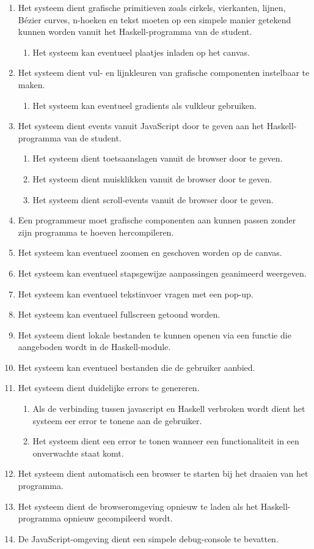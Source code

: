\begin{enumerate}[{R}1]
	\item Het systeem dient grafische primitieven zoals cirkels, vierkanten, lijnen, Bézier curves, n-hoeken en tekst moeten op een simpele manier getekend kunnen worden vanuit het Haskell-programma van de student.
	\begin{enumerate}[{R1.}1]
		\item Het systeem kan eventueel plaatjes inladen op het canvas.
	\end{enumerate}
	\item Het systeem dient vul- en lijnkleuren van grafische componenten instelbaar te maken.
	\begin{enumerate}[{R2.}1]
		\item Het systeem kan eventueel gradients als vulkleur gebruiken.
	\end{enumerate}
	\item Het systeem dient events vanuit JavaScript door te geven aan het Haskell-programma van de student.
	\begin{enumerate}[{R3.}1]
		\item Het systeem dient toetsaanslagen vanuit de browser door te geven.
		\item Het systeem dient muisklikken vanuit de browser door te geven.
		\item Het systeem dient scroll-events vanuit de browser door te geven.
	\end{enumerate}
	\item Een programmeur moet grafische componenten aan kunnen passen zonder zijn programma te hoeven hercompileren.
	\item Het systeem kan eventueel zoomen en geschoven worden op de canvas.
	\item Het systeem kan eventueel stapsgewijze aanpassingen geanimeerd weergeven.
	\item Het systeem kan eventueel tekstinvoer vragen met een pop-up.
	\item Het systeem kan eventueel fullscreen getoond worden.
	\item Het systeem dient lokale bestanden te kunnen openen via een functie die aangeboden wordt in de Haskell-module.
	\item Het systeem kan eventueel bestanden die de gebruiker aanbied.
	\item Het systeem dient duidelijke errors te genereren.
	\begin{enumerate}[{R8.}1]
		\item Als de verbinding tussen javascript en Haskell verbroken wordt dient het systeem eer error te tonene aan de gebruiker. 
		\item Het systeem dient een error te tonen wanneer een functionaliteit in een onverwachte staat komt.
	\end{enumerate}
	\item Het systeem dient automatisch een browser te starten bij het draaien van het programma.
	\item Het systeem dient de browseromgeving opnieuw te laden als het Haskell-programma opnieuw gecompileerd wordt.
	\item De JavaScript-omgeving dient een simpele debug-console te bevatten.


\end{enumerate}
